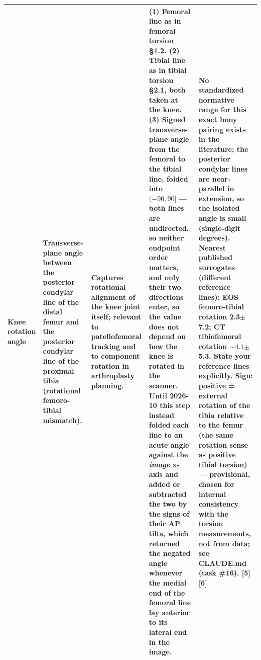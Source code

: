 \documentclass[10pt]{article}
\begin{document}
\begin{footnotesize}
\begin{longtable}{L{2.5cm} L{4.0cm} L{4.0cm} L{9.2cm} L{5.4cm}}
\textbf{Knee rotation angle} &
Transverse-plane angle between the posterior condylar line of the distal femur and the
posterior condylar line of the proximal tibia (rotational femoro-tibial mismatch). &
Captures rotational alignment of the knee joint itself; relevant to patellofemoral
tracking and to component rotation in arthroplasty planning. &
(1) \textbf{Femoral line} as in femoral torsion \S1.2. (2) \textbf{Tibial line} as in
tibial torsion \S2.1, both taken at the knee. (3) \textbf{Signed} transverse-plane angle
from the femoral to the tibial line, folded into $(-90, 90]$ --- both lines are
undirected, so neither endpoint order matters, and only their two directions enter, so
the value does not depend on how the knee is rotated in the scanner. Until 2026-10 this
step instead folded each line to an acute angle against the \emph{image} x-axis and added
or subtracted the two by the signs of their AP tilts, which returned the negated angle
whenever the medial end of the femoral line lay anterior to its lateral end in the
image. &
No standardized normative range for this exact bony pairing exists in the literature;
the posterior condylar lines are near-parallel in extension, so the isolated angle is
small (single-digit degrees). Nearest published surrogates (different reference lines):
EOS femoro-tibial rotation 2.3\textdegree{}$\pm$7.2\textdegree{}; CT tibiofemoral
rotation ${\sim}4.1$\textdegree{}$\pm$5.3\textdegree{}. State your reference lines
explicitly. \textbf{Sign:} positive = external rotation of the tibia relative to the
femur (the same rotation sense as positive tibial torsion) --- \textbf{provisional},
chosen for internal consistency with the torsion measurements, not from data; see
CLAUDE.md (task \#16). [5][6] \\
\midrule


\end{longtable}
\end{footnotesize}
\end{document}
